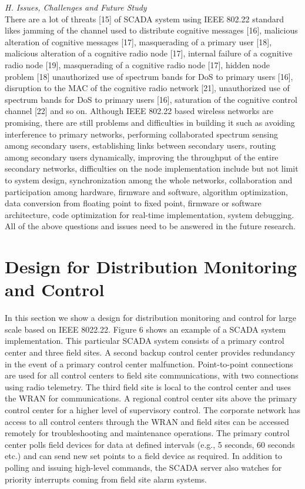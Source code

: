 \documentclass[conference]{IEEEtran}
\begin{document}
\begin{Summary - }
\vspace{0.2cm}\emph{H. \hspace{0.3cm}Issues, Challenges and Future Study}\\
There are a lot of threats [15] of SCADA system using
IEEE 802.22 standard likes jamming of the channel used to
distribute cognitive messages [16], malicious alteration of
cognitive messages [17], masquerading of a primary user [18],
malicious alteration of a cognitive radio node [17], internal
failure of a cognitive radio node [19], masquerading of a
cognitive radio node [17], hidden node problem [18]
unauthorized use of spectrum bands for DoS to primary users
[16], disruption to the MAC of the cognitive radio network
[21], unauthorized use of spectrum bands for DoS to primary
users [16], saturation of the cognitive control channel [22] and
so on. Although IEEE 802.22 based wireless networks are
promising, there are still problems and difficulties in building it
such as avoiding interference to primary networks, performing
collaborated spectrum sensing among secondary users,
establishing links between secondary users, routing among
secondary users dynamically, improving the throughput of the
entire secondary networks, difficulties on the node
implementation include but not limit to system design,
synchronization among the whole networks, collaboration and
participation among hardware, firmware and software,
algorithm optimization, data conversion from floating point to
fixed point, firmware or software architecture, code
optimization for real-time implementation, system debugging.
All of the above questions and issues need to be answered in
the future research.

\vspace{1cm}

\section{Design for Distribution Monitoring and Control}
In this section we show a design for distribution monitoring
and control for large scale based on IEEE 8022.22. Figure 6
shows an example of a SCADA system implementation. This
particular SCADA system consists of a primary control center
and three field sites. A second backup control center provides
redundancy in the event of a primary control center
malfunction. Point-to-point connections are used for all control
centers to field site communications, with two connections
using radio telemetry. The third field site is local to the control
center and uses the WRAN for communications. A regional
control center sits above the primary control center for a higher
level of supervisory control. The corporate network has access
to all control centers through the WRAN and field sites can be
accessed remotely for troubleshooting and maintenance
operations. The primary control center polls field devices for
data at defined intervals (e.g., 5 seconds, 60 seconds etc.) and
can send new set points to a field device as required. In
addition to polling and issuing high-level commands, the
SCADA server also watches for priority interrupts coming
from field site alarm systems.



\end{Summary - }
\end{document}
